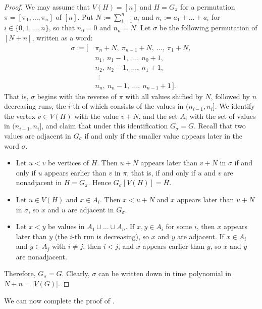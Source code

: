 \documentclass[a4paper,fleqn]{cas-sc}
\theoremstyle{remark}
\theoremstyle{plain}
\begin{document}
\begin{proof}
    We may assume that $V(H)=[n]$ and $H = G_\pi$ for a permutation $\pi=[\pi_1, \dots, \pi_n]$ of $[n]$.  Put $N := \sum_{i=1}^n a_i$ and $n_i := a_1 + \dots + a_i$ for $i \in \{0, 1, \dots, n\}$, so that $n_0 = 0$ and $n_n=N$.  Let $\sigma$ be the following permutation of $[N+n]$, written as a word:
    \[
    \begin{aligned}
        \sigma := [\,&\pi_n + N,\ \pi_{n-1}+N,\ \dots,\ \pi_1+N,\\
        &n_1,\ n_1-1,\ \dots,\ n_0+1,\\
        &n_2,\ n_2-1,\ \dots,\ n_1+1,\\
        &\ \ \vdots\\
        &n_n,\ n_n-1,\ \dots,\ n_{n-1}+1\,].
    \end{aligned}
    \]
    That is, $\sigma$ begins with the reverse of $\pi$ with all values shifted by $N$, followed by $n$ decreasing runs, the $i$-th of which consists of the values in $(n_{i-1}, n_i]$.  We identify the vertex $v \in V(H)$ with the value $v+N$, and the set $A_i$ with the set of values in $(n_{i-1}, n_i]$, and claim that under this identification $G_\sigma = G$.  Recall that two values are adjacent in $G_\sigma$ if and only if the smaller value appears later in the word $\sigma$.
    \begin{itemize}
        \item Let $u < v$ be vertices of $H$.  Then $u+N$ appears later than $v+N$ in $\sigma$ if and only if $u$ appears earlier than $v$ in $\pi$, that is, if and only if $u$ and $v$ are nonadjacent in $H=G_\pi$.  Hence $G_\sigma[V(H)] = \overline{H}$.
        \item Let $u \in V(H)$ and $x \in A_i$.  Then $x < u+N$ and $x$ appears later than $u+N$ in $\sigma$, so $x$ and $u$ are adjacent in $G_\sigma$.
        \item Let $x < y$ be values in $A_1 \cup \dots \cup A_n$.  If $x, y \in A_i$ for some $i$, then $x$ appears later than $y$ (the $i$-th run is decreasing), so $x$ and $y$ are adjacent.  If $x \in A_i$ and $y \in A_j$ with $i \neq j$, then $i<j$, and $x$ appears earlier than $y$, so $x$ and $y$ are nonadjacent.
    \end{itemize}
    Therefore, $G_\sigma = G$.  Clearly, $\sigma$ can be written down in time polynomial in $N+n=|V(G)|$.
\end{proof}

We can now complete the proof of .
\end{document}
